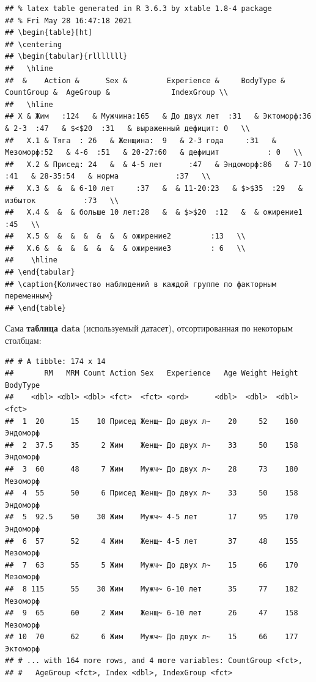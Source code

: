 \documentclass[
]{article}
\begin{document}
\begin{verbatim}
## % latex table generated in R 3.6.3 by xtable 1.8-4 package
## % Fri May 28 16:47:18 2021
## \begin{table}[ht]
## \centering
## \begin{tabular}{rlllllll}
##   \hline
##  &    Action &      Sex &         Experience &     BodyType & CountGroup &  AgeGroup &              IndexGroup \\ 
##   \hline
## X & Жим   :124   & Мужчина:165   & До двух лет  :31   & Эктоморф:36   & 2-3  :47   & $<$20  :31   & выраженный дефицит: 0   \\ 
##   X.1 & Тяга  : 26   & Женщина:  9   & 2-3 года     :31   & Мезоморф:52   & 4-6  :51   & 20-27:60   & дефицит           : 0   \\ 
##   X.2 & Присед: 24   &  & 4-5 лет      :47   & Эндоморф:86   & 7-10 :41   & 28-35:54   & норма             :37   \\ 
##   X.3 &  &  & 6-10 лет     :37   &  & 11-20:23   & $>$35  :29   & избыток           :73   \\ 
##   X.4 &  &  & больше 10 лет:28   &  & $>$20  :12   &  & ожирение1         :45   \\ 
##   X.5 &  &  &  &  &  &  & ожирение2         :13   \\ 
##   X.6 &  &  &  &  &  &  & ожирение3         : 6   \\ 
##    \hline
## \end{tabular}
## \caption{Количество наблюдений в каждой группе по факторным переменным} 
## \end{table}
\end{verbatim}

Сама \textbf{таблица data} (используемый датасет), отсортированная по
некоторым столбцам:

\begin{verbatim}
## # A tibble: 174 x 14
##       RM   MRM Count Action Sex   Experience   Age Weight Height BodyType
##    <dbl> <dbl> <dbl> <fct>  <fct> <ord>      <dbl>  <dbl>  <dbl> <fct>   
##  1  20      15    10 Присед Женщ~ До двух л~    20     52    160 Эндоморф
##  2  37.5    35     2 Жим    Женщ~ До двух л~    33     50    158 Эндоморф
##  3  60      48     7 Жим    Мужч~ До двух л~    28     73    180 Мезоморф
##  4  55      50     6 Присед Женщ~ До двух л~    33     50    158 Эндоморф
##  5  92.5    50    30 Жим    Мужч~ 4-5 лет       17     95    170 Эндоморф
##  6  57      52     4 Жим    Женщ~ 4-5 лет       37     48    155 Мезоморф
##  7  63      55     5 Жим    Мужч~ До двух л~    15     66    170 Мезоморф
##  8 115      55    30 Жим    Мужч~ 6-10 лет      35     77    182 Мезоморф
##  9  65      60     2 Жим    Женщ~ 6-10 лет      26     47    158 Мезоморф
## 10  70      62     6 Жим    Мужч~ До двух л~    15     66    177 Эктоморф
## # ... with 164 more rows, and 4 more variables: CountGroup <fct>,
## #   AgeGroup <fct>, Index <dbl>, IndexGroup <fct>
\end{verbatim}
\end{document}
